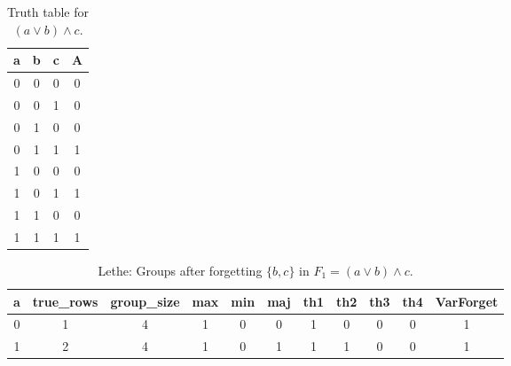 \begin{table}[!tb]
    \centering
    \begin{tabular}{|c|c|c|c|}
        \hline
        \textbf{a} & \textbf{b} & \textbf{c} & \textbf{A} \\ \hline
        0 & 0 & 0 & 0 \\ \hline
        0 & 0 & 1 & 0 \\ \hline
        0 & 1 & 0 & 0 \\ \hline
        0 & 1 & 1 & 1 \\ \hline
        1 & 0 & 0 & 0 \\ \hline
        1 & 0 & 1 & 1 \\ \hline
        1 & 1 & 0 & 0 \\ \hline
        1 & 1 & 1 & 1 \\ \hline
    \end{tabular}
    \caption{Truth table for $(a \lor b) \land c$.}
    \label{tab:truthtab}
\end{table}

\begin{table}[!tb]
    \centering
    \begin{tabular}{|c|c|c|c|c|c|c|c|c|c|c|}
        \hline
        \textbf{a} & \textbf{true\_rows} & \textbf{group\_size} & \textbf{max} & \textbf{min} & \textbf{maj} & \textbf{th1} & \textbf{th2} & \textbf{th3} & \textbf{th4} & \textbf{VarForget} \\ \hline
        \rowcolor{gray!40} 0 & 1 & 4 & 1 & 0 & 0 & 1 & 0 & 0 & 0 & 1 \\ \hline
        \rowcolor{blue!40} 1 & 2 & 4 & 1 & 0 & 1 & 1 & 1 & 0 & 0 & 1 \\ \hline
    \end{tabular}
    \caption{Lethe: Groups after forgetting $\{b, c\}$ in $F_{1} = (a \lor b) \land c$.}
    \label{tab:lethe-F1-bc-groups}
\end{table}
